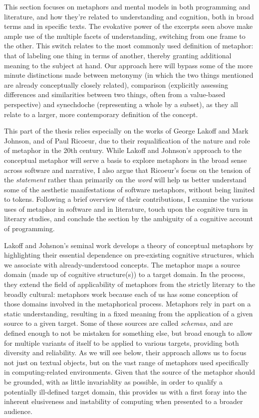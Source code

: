 \documentclass{article}
\begin{document}
This section focuses on metaphors and mental models in both programming and literature, and how they're related to understanding and cognition, both in broad terms and in specific texts. The evokative power of the excerpts seen above make ample use of the multiple facets of understanding, switching from one frame to the other. This switch relates to the most commonly used definition of metaphor: that of labeling one thing in terms of another, thereby granting additional meaning to the subject at hand. Our approach  here will bypass some of the more minute distinctions made between metonymy (in which the two things mentioned are already conceptually closely related), comparison (explicitly assessing differences and similarities between two things, often from a value-based perspective) and synechdoche (representing a whole by a subset), as they all relate to a larger, more contemporary definition of the concept.

This part of the thesis relies especially on the works of George Lakoff and Mark Johnson, and of Paul Ricoeur, due to their requalification of the nature and role of metaphor in the 20th century. While Lakoff and Johnson's approach to the conceptual metaphor will serve a basis to explore metaphors in the broad sense across software and narrative, I also argue that Ricoeur's focus on the tension of the \emph{statement} rather than primarily on the \emph{word} will help us better understand some of the aesthetic manifestations of software metaphors, without being limited to tokens. Following a brief overview of their contributions, I examine the various uses of metaphor in software and in literature, touch upon the cognitive turn in literary studies, and conclude the section by the ambiguity of a cognitive account of programming.

Lakoff and Johsnon's seminal work develops a theory of conceptual metaphors by highlighting their essential dependence on pre-existing cognitive structures, which we associate with already-understood concepts. The metaphor maps a source domain (made up of cognitive structure(s)) to a target domain. In the process, they extend the field of applicability of metaphors from the strictly literary to the broadly cultural: metaphors work because each of us has some conception of those domains involved in the metaphorical process. Metaphors rely in part on a static understanding, resulting in a fixed meaning from the application of a given source to a given target. Some of these sources are called \emph{schemas}, and are defined enough to not be mistaken for something else, but broad enough to allow for multiple variants of itself to be applied to various targets\cite{lakoff_metaphors_1980}, providing both diversity and reliability. As we will see below, their approach allows us to focus not just on textual objects, but on the vast range of metaphors used specifically in computing-related environments. Given that the source of the metaphor should be grounded, with as little invariablity as possible, in order to qualify a potentially ill-defined target domain, this provides us with a first foray into the inherent elusiveness and instability of computing when presented to a broader audience.
\end{document}
